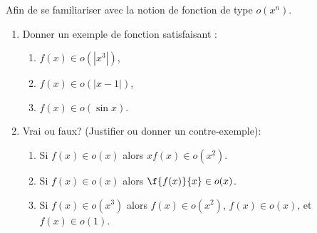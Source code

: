 
\begin{exercice}\label{exoDevel0001}

Afin de se familiariser avec la notion de fonction de type $o(x^n)$.
\begin{enumerate}
\item Donner un exemple de fonction satisfaisant : 
\begin{enumerate}
\item $f(x)\in o(|x^3|)$,  \item $f(x)\in o(|x-1|)$,  \item $f(x)\in o(\sin x)$.\end{enumerate}

\item Vrai ou faux? (Justifier ou donner un contre-exemple):
\begin{enumerate}
\item Si $f(x)\in o(x)$ alors $xf(x)\in o(x^2)$.
\item Si $f(x)\in o(x)$ alors $\f{f(x)}{x}\in o(x)$.
\item Si $f(x)\in o(x^3)$ alors $f(x)\in o(x^2)$, $f(x)\in o(x)$, et $f(x)\in o(1)$.
\end{enumerate}
\end{enumerate}


\end{exercice}
